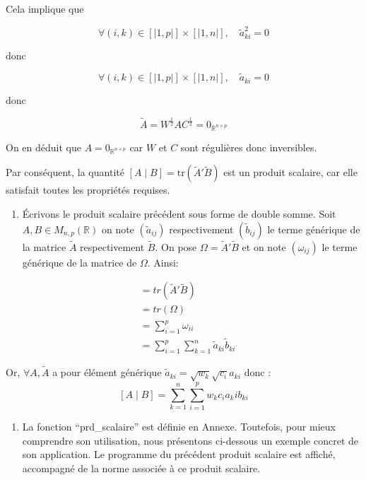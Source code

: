 \documentclass[
]{article}
\providecommand{\tightlist}{%
  \setlength{\itemsep}{0pt}\setlength{\parskip}{0pt}}
\begin{document}
Cela implique que

\[\forall (i,k) \in [|1,p|] \times [|1,n|], \quad \tilde{a}_{ki}^2 = 0 \]

donc

\[\forall (i,k) \in [|1,p|] \times [|1,n|], \quad \tilde{a}_{ki} = 0 \]

donc

\[\tilde{A} = W^{\frac{1}{2}} A C^{\frac{1}{2}} = 0_{\mathbb{R}^{n \times p}} \]

On en déduit que \(A = 0_{\mathbb{R}^{n \times p}}\) car \(W\) et \(C\)
sont régulières donc inversibles.

Par conséquent, la quantité
\([A \mid B] = \text{tr}(\tilde{A}'\tilde{B})\) est un produit scalaire,
car elle satisfait toutes les propriétés requises.

\begin{enumerate}
\def\labelenumi{\alph{enumi})}
\setcounter{enumi}{2}
\tightlist
\item
  Écrivons le produit scalaire précédent sous forme de double somme.
  Soit \(A,B \in M_{n,p}(\mathbb{R})\) on note \((\tilde{a}_{ij})\)
  respectivement \((\tilde{b}_{ij})\) le terme générique de la matrice
  \(\tilde{A}\) respectivement \(\tilde{B}\). On pose
  \(\Omega = \tilde{A}'\tilde{B}\) et on note \((\omega_{ij})\) le terme
  générique de la matrice de \(\Omega\). Ainsi:
\end{enumerate}

\begin{align*}
[A \mid B] &= tr(\tilde{A}'\tilde{B})\\
&= tr(\Omega)\\
&= \sum_{i=1}^{p} \omega_{ii}\\
 &= \sum_{i=1}^{p} \sum_{k=1}^{n} \tilde{a}_{ki} \tilde{b}_{ki}
\end{align*}

Or, \(\forall A, \tilde{A}\) a pour élément générique
\(\tilde{a}_{ki} = \sqrt{w_k} \sqrt{c_i} a_{ki}\) donc :
\[ [A \mid B] = \sum_{k=1}^{n} \sum_{i=1}^{p} w_k c_i a_ki b_{ki} \]

\begin{enumerate}
\def\labelenumi{\alph{enumi})}
\setcounter{enumi}{3}
\tightlist
\item
  La fonction ``prd\_scalaire'' est définie en Annexe. Toutefois, pour
  mieux comprendre son utilisation, nous présentons ci-dessous un
  exemple concret de son application. Le programme du précédent produit
  scalaire est affiché, accompagné de la norme associée à ce produit
  scalaire.
\end{enumerate}
\end{document}
